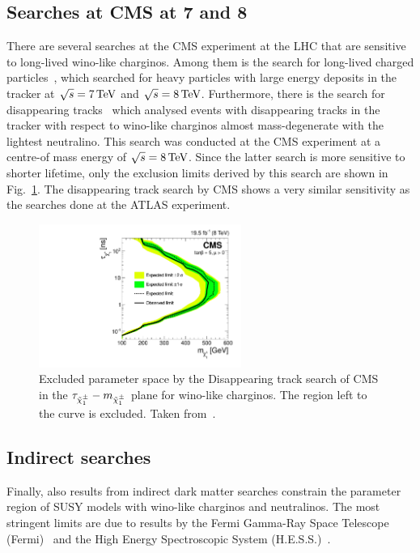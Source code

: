\subsection*{Searches at CMS at 7 and 8\tev}
There are several searches at the CMS experiment at the LHC that are sensitive to long-lived wino-like charginos.
Among them is the search for long-lived charged particles~\cite{bib:CMS:HSCP_8TeV}, which searched for heavy particles with large energy deposits in the tracker at $\sqrt{s}=7\,\text{Te}\kern-0.06667em\text{V}$  and $\sqrt{s}=8\,\text{Te}\kern-0.06667em\text{V}$.
Furthermore, there is the search for disappearing tracks~\cite{bib:CMS:DT_8TeV} which analysed events with disappearing tracks in the tracker with respect to wino-like charginos almost mass-degenerate with the lightest neutralino.
This search was conducted at the CMS experiment at a centre-of mass energy of $\sqrt{s}=8\,\text{Te}\kern-0.06667em\text{V}$.
Since the latter search is more sensitive to shorter lifetime, only the exclusion limits derived by this search are shown in Fig.~\ref{fig:CMS}.
The disappearing track search by CMS shows a very similar sensitivity as the searches done at the ATLAS experiment.
\begin{figure}[!h]
  \centering
      \includegraphics[width=0.59\textwidth]{figures/theory/lifetimeNs_vs_mass.pdf}
  \caption{Excluded parameter space by the Disappearing track search of CMS in the $\tau_{\tilde{\chi}^{\pm}_{1}}-m_{\tilde{\chi}^{\pm}_{1}}$ plane for wino-like charginos. The region left to the curve is excluded. Taken from~\cite{bib:CMS:DT_8TeV}.}  
  \label{fig:CMS}
\end{figure}

\subsection*{Indirect searches}
Finally, also results from indirect dark matter searches constrain the parameter region of SUSY models with wino-like charginos and neutralinos.
The most stringent limits are due to results by the Fermi Gamma-Ray Space Telescope (Fermi)~\cite{bib:Fermi} and the High Energy Spectroscopic System (H.E.S.S.)~\cite{bib:HESS}.

